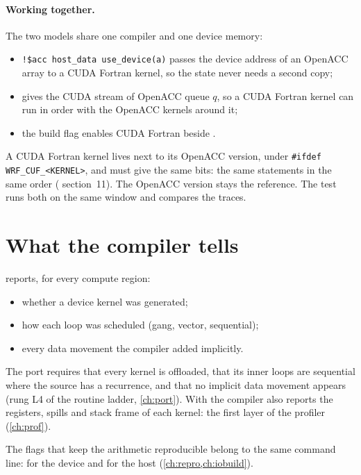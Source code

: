 \paragraph{Working together.} The two models share one compiler and one device memory:
\begin{itemize}
  \item \texttt{!\$acc host\_data use\_device(a)} passes the device address of an OpenACC array to a CUDA Fortran
    kernel, so the state never needs a second copy;
  \item {} gives the CUDA stream of OpenACC queue $q$, so a CUDA Fortran kernel can run in
    order with the OpenACC kernels around it;
  \item the build flag  enables CUDA Fortran beside .
\end{itemize}

\begin{portnote}
A CUDA Fortran kernel lives next to its OpenACC version, under \texttt{\#ifdef WRF\_CUF\_<KERNEL>}, and must give the same
bits: the same statements in the same order ( section~11). The OpenACC version stays the
reference. The test runs both on the same window and compares the traces.
\end{portnote}

\section{What the compiler tells}

 reports, for every compute region:
\begin{itemize}
  \item whether a device kernel was generated;
  \item how each loop was scheduled (gang, vector, sequential);
  \item every data movement the compiler added implicitly.
\end{itemize}
The port requires that every kernel is offloaded, that its inner loops are sequential where the source has a
recurrence, and that no implicit data movement appears (rung L4 of the routine ladder, \cref{ch:port}). With
 the compiler also reports the registers, spills and stack frame of each kernel: the first layer of
the profiler (\cref{ch:prof}).

The flags that keep the arithmetic reproducible belong to the same command line:  for the
device and  for the host (\cref{ch:repro,ch:iobuild}).

